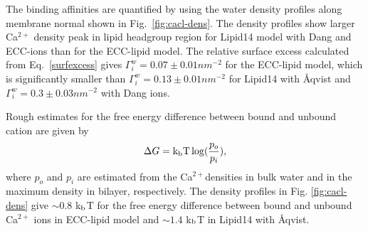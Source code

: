 \documentclass[aip,jcp,twocolumn]{revtex4}
\begin{document}
The binding affinities are quantified by using
the water density profiles along membrane normal shown
in Fig.~\ref{fig:cacl-dens}. The density profiles show
larger Ca$^{2+}$ density peak in lipid headgroup region for
Lipid14 model with Dang and ECC-ions than for the ECC-lipid model.
The relative surface excess calculated from Eq.~\ref{surfexcess} gives 
$\Gamma_i^w = 0.07 \pm 0.01 nm^{-2}$ for the ECC-lipid model,
which is significantly smaller than $\Gamma_i^w = 0.13 \pm 0.01 nm^{-2}$ for
Lipid14 with \AA{}qvist and $\Gamma_i^w = 0.3 \pm 0.03 nm^{-2}$ with Dang ions.

Rough estimates for the free energy difference between bound and unbound cation
are given by
\begin{equation}
  \Delta G={\rm k_b T}\log(\frac{p_o}{p_i}),
\end{equation}
where $p_o$ and $p_i$ are estimated from the Ca$^{2+}$densities in bulk water and
in the maximum density in bilayer, respectively. The density profiles in
Fig. \ref{fig:cacl-dens} give $\sim 0.8$ k$_{\rm b}$T for the free energy difference
between bound and unbound Ca$^{2+}$ ions in ECC-lipid model and $\sim 1.4$ k$_{\rm b}$T
in Lipid14 with \AA{}qvist.

\end{document}
